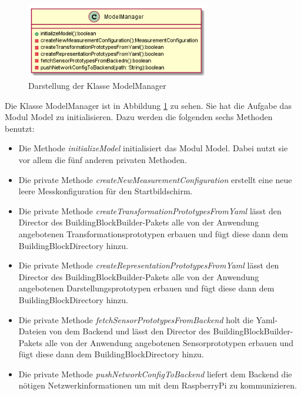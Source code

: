 \documentclass[parskip=full]{scrartcl}
\begin{document}
\begin{figure}[htbp]
	\begin{center}
		\includegraphics[width = 8cm]{Grafiken/ModelManager.png}
		\caption{Darstellung der Klasse ModelManager}
		\label{ModelManager}
	\end{center}
\end{figure}
Die Klasse ModelManager ist in Abbildung \ref{ModelManager} zu sehen. Sie hat die Aufgabe das Modul Model zu initialisieren. Dazu werden die folgenden sechs Methoden benutzt: 
\begin{itemize}

\item Die Methode \textit{initializeModel} initialisiert das Modul Model. Dabei nutzt sie vor allem die fünf anderen privaten Methoden.
\item Die private Methode \textit{createNewMeasurementConfiguration} erstellt eine neue leere Messkonfiguration für den Startbildschirm. 
\item Die private Methode \textit{createTransformationPrototypesFromYaml} lässt den Director des BuildingBlockBuilder-Pakets alle von der Anwendung angebotenen Transformationsprototypen erbauen und fügt diese dann dem BuildingBlockDirectory hinzu.
\item Die private Methode \textit{createRepresentationPrototypesFromYaml} lässt den Director des BuildingBlockBuilder-Pakets alle von der Anwendung angebotenen Darstellungsprototypen erbauen und fügt diese dann dem BuildingBlockDirectory hinzu.
\item Die private Methode \textit{fetchSensorPrototypesFromBackend} holt die Yaml-Dateien von dem Backend und lässt den Director des BuildingBlockBuilder-Pakets alle von der Anwendung angebotenen Sensorprototypen erbauen und fügt diese dann dem BuildingBlockDirectory hinzu.
\item Die private Methode \textit{pushNetworkConfigToBackend} liefert dem Backend die nötigen Netzwerkinformationen um mit dem RaspberryPi zu kommunizieren.

\end{itemize}
\end{document}
